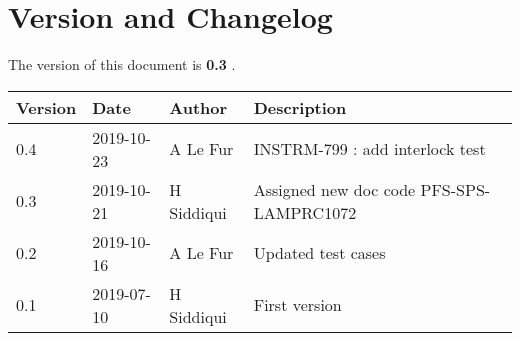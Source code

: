 \section{Version and Changelog}

The version of this document is {\bf 0.3} .

\begin{table}[H]
    \begin{tabular}{|l|l|l|p{10cm}| }
    \hline
    {\bf Version} & {\bf Date} & {\bf Author} & {\bf Description} \\ \hline
    0.4 & 2019-10-23 & A Le Fur & INSTRM-799 : add interlock test\\ \hline
    0.3 & 2019-10-21 & H Siddiqui & Assigned new doc code PFS-SPS-LAMPRC1072 \\ \hline
    0.2 & 2019-10-16 & A Le Fur & Updated test cases \\ \hline
    0.1 & 2019-07-10 & H Siddiqui & First version \\ \hline
    \end{tabular}
\end{table}


